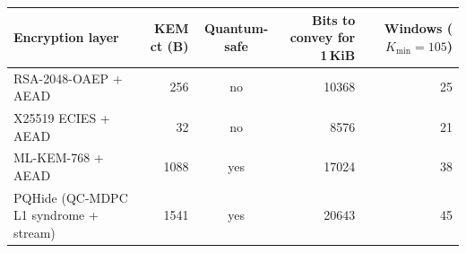 \begin{tabular}{lrcrr}
\toprule
Encryption layer & KEM ct (B) & Quantum-safe & Bits to convey for 1\,KiB & Windows ($K_{\min}{=}105$)\\
\midrule
RSA-2048-OAEP + AEAD & 256 & no & 10368 & 25\\
X25519 ECIES + AEAD & 32 & no & 8576 & 21\\
ML-KEM-768 + AEAD & 1088 & yes & 17024 & 38\\
PQHide (QC-MDPC L1 syndrome + stream) & 1541 & yes & 20643 & 45\\
\bottomrule
\end{tabular}
